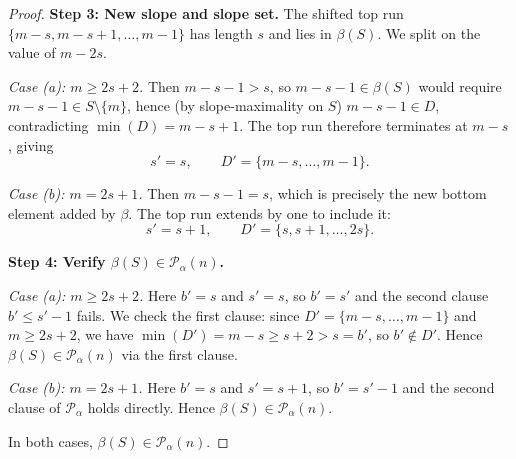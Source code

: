\begin{proof}
\textbf{Step 3: New slope and slope set.} The shifted top run
$\{m-s, m-s+1, \ldots, m-1\}$ has length $s$ and lies in $\beta(S)$. We split
on the value of $m - 2s$.

\emph{Case (a): $m \geq 2s+2$.} Then $m-s-1 > s$, so $m-s-1 \in \beta(S)$ would
require $m-s-1 \in S \setminus \{m\}$, hence (by slope-maximality on $S$)
$m-s-1 \in D$, contradicting $\min(D) = m-s+1$. The top run therefore
terminates at $m-s$, giving
\[
s' = s, \qquad D' = \{m-s, \ldots, m-1\}.
\]

\emph{Case (b): $m = 2s+1$.} Then $m - s - 1 = s$, which is precisely the new
bottom element added by $\beta$. The top run extends by one to include it:
\[
s' = s + 1, \qquad D' = \{s, s+1, \ldots, 2s\}.
\]

\textbf{Step 4: Verify $\beta(S) \in \mathcal{P}_\alpha(n)$.}

\emph{Case (a): $m \geq 2s+2$.} Here $b' = s$ and $s' = s$, so $b' = s'$ and
the second clause $b' \leq s' - 1$ fails. We check the first clause: since
$D' = \{m-s, \ldots, m-1\}$ and $m \geq 2s+2$, we have $\min(D') = m-s
\geq s+2 > s = b'$, so $b' \notin D'$. Hence $\beta(S) \in \mathcal{P}_\alpha(n)$
via the first clause.

\emph{Case (b): $m = 2s+1$.} Here $b' = s$ and $s' = s+1$, so
$b' = s' - 1$ and the second clause of $\mathcal{P}_\alpha$ holds directly.
Hence $\beta(S) \in \mathcal{P}_\alpha(n)$.

In both cases, $\beta(S) \in \mathcal{P}_\alpha(n)$.
\end{proof}

